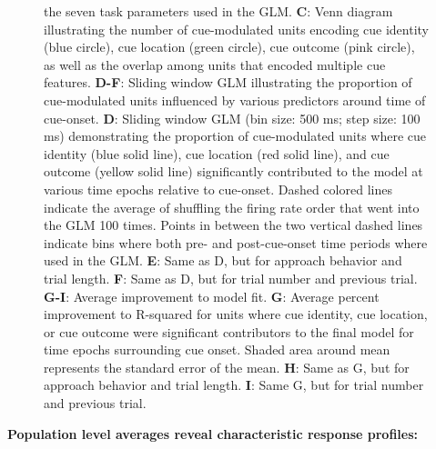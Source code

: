 \documentclass[11pt]{article}
\newcommand{\bsf}[1]{\textbf{#1}}
\begin{document}
\begin{figure}[h]
{the seven task parameters used in the GLM. \bsf{C}: Venn diagram illustrating the number of cue-modulated units encoding cue identity (blue circle), cue location (green circle), cue outcome (pink circle), as well as the overlap among units that encoded multiple cue features. \bsf{D-F}: Sliding window GLM illustrating the proportion of cue-modulated units influenced by various predictors around time of cue-onset. \bsf{D}: Sliding window GLM (bin size: 500 ms; step size: 100 ms) demonstrating the proportion of cue-modulated units where cue identity (blue solid line), cue location (red solid line), and cue outcome (yellow solid line) significantly contributed to the model at various time epochs relative to cue-onset. Dashed colored lines indicate the average of shuffling the firing rate order that went into the GLM 100 times. Points in between the two vertical dashed lines indicate bins where both pre- and post-cue-onset time periods where used in the GLM. \bsf{E}: Same as D, but for approach behavior and trial length. \bsf{F}: Same as D, but for trial number and previous trial. \bsf{G-I}: Average improvement to model fit. \bsf{G}: Average percent improvement to R-squared for units where cue identity, cue location, or cue outcome were significant contributors to the final model for time epochs surrounding cue onset. Shaded area around mean represents the standard error of the mean. \bsf{H}: Same as G, but for approach behavior and trial length. \bsf{I}: Same G, but for trial number and previous trial.}
\label{fig:GLM}
\end{figure}
{\bf Population level averages reveal characteristic response profiles:}
\end{document}
